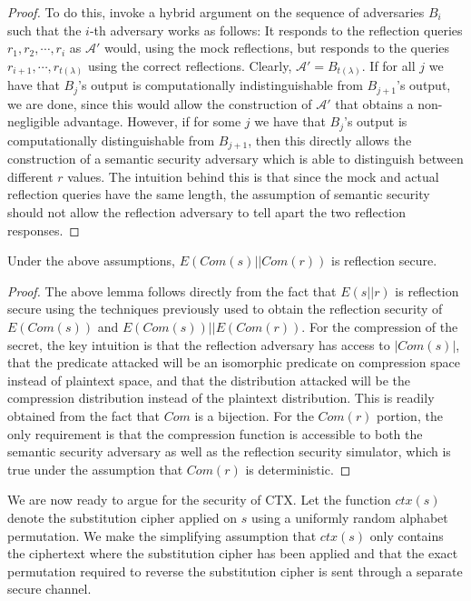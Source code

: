 \begin{proof}
    To do this, invoke a hybrid argument on the sequence of adversaries $B_i$
    such that the $i$-th adversary works as follows: It responds to the
    reflection queries $r_1, r_2, \cdots, r_i$ as $\mathcal{A'}$ would,
    using the mock reflections, but responds to the queries $r_{i+1},
    \cdots, r_{t(\lambda)}$ using the correct reflections. Clearly,
    $\mathcal{A'} = B_{t(\lambda)}$. If for all $j$ we have that $B_j$'s output
    is computationally indistinguishable from $B_{j+1}$'s output, we are done,
    since this would allow the construction of $\mathcal{A'}$ that obtains a
    non-negligible advantage. However, if for some $j$ we have that $B_j$'s
    output is computationally distinguishable from $B_{j+1}$, then this
    directly allows the construction of a semantic security adversary which is
    able to distinguish between different $r$ values. The intuition behind this
    is that since the mock and actual reflection queries have the same length,
    the assumption of semantic security should not allow the reflection
    adversary to tell apart the two reflection responses.
\end{proof}

\begin{lemma}
    Under the above assumptions, $E(Com(s) || Com(r))$ is reflection secure.
\end{lemma}

\begin{proof}
    The above lemma follows directly from the fact that $E(s || r)$ is
    reflection secure using the techniques previously used to obtain the
    reflection security of $E(Com(s))$ and $E(Com(s)) || E(Com(r))$. For the
    compression of the secret, the key intuition is that the reflection
    adversary has access to $|Com(s)|$, that the predicate attacked will be an
    isomorphic predicate on compression space instead of plaintext space, and
    that the distribution attacked will be the compression distribution instead
    of the plaintext distribution. This is readily obtained from the fact that
    $Com$ is a bijection. For the $Com(r)$ portion, the only
    requirement is that the compression function is accessible to both the
    semantic security adversary as well as the reflection security simulator,
    which is true under the assumption that $Com(r)$ is deterministic.
\end{proof}

We are now ready to argue for the security of CTX. Let the function $ctx(s)$
denote the substitution cipher applied on $s$ using a uniformly random alphabet
permutation. We make the simplifying assumption that $ctx(s)$ only contains the
ciphertext where the substitution cipher has been applied and that the exact
permutation required to reverse the substitution cipher is sent through a
separate secure channel.

